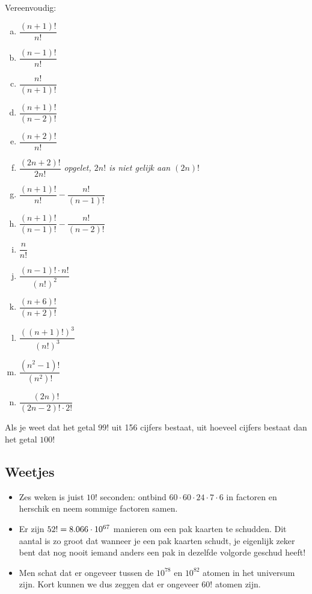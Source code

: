 \documentclass[12pt,a4paper,twoside]{article}
\begin{document}
\begin{oefening}
Vereenvoudig:
\begin{multicols}{2}
\begin{enumerate}[(a)]
  \itemsep.7em
  \item $\dfrac{(n+1)!}{n!}$
  \item $\dfrac{(n-1)!}{n!}$
  \item $\dfrac{n!}{(n+1)!}$
  \item $\dfrac{(n+1)!}{(n-2)!}$
  \item $\dfrac{(n+2)!}{n!}$
  \item $\dfrac{(2n+2)!}{2n!}$ \hfill {\em\scriptsize opgelet, $2n!$ is niet gelijk aan $(2n)!$}
  \item $\dfrac{(n+1)!}{n!}-\dfrac{n!}{(n-1)!}$
  \item $\dfrac{(n+1)!}{(n-1)!}-\dfrac{n!}{(n-2)!}$
  \item $\dfrac{n}{n!}$
  \item $\dfrac{(n-1)!\cdot n!}{(n!)^2}$
  \item $\dfrac{(n+6)!}{(n+2)!}$
  \item $\dfrac{\left(\left(n+1\right)!\right)^3}{(n!)^3}$
  \item $\dfrac{(n^2-1)!}{(n^2)!}$
  \item $\dfrac{(2n)!}{(2n-2)!\cdot 2!}$
\end{enumerate}
\end{multicols}
\end{oefening}

\begin{oefening}
Als je weet dat het getal $99!$ uit 156 cijfers bestaat, uit hoeveel cijfers bestaat dan het getal $100!$
\end{oefening}

\subsection*{Weetjes}
\begin{itemize}
  \item Zes weken is juist $10!$ seconden: ontbind $60\cdot 60\cdot 24\cdot 7\cdot 6$ in factoren en herschik en neem sommige factoren samen.
  \item Er zijn $52!=8.066\cdot 10^{67}$ manieren om een pak kaarten te schudden. Dit aantal is zo groot dat wanneer je een pak kaarten schudt, je eigenlijk zeker bent dat nog nooit iemand anders een pak in dezelfde volgorde geschud heeft!
  \item Men schat dat er ongeveer tussen de $10^{78}$ en $10^{82}$ atomen in het universum zijn. Kort kunnen we dus zeggen dat er ongeveer $60!$ atomen zijn.
\end{itemize}
\end{document}
